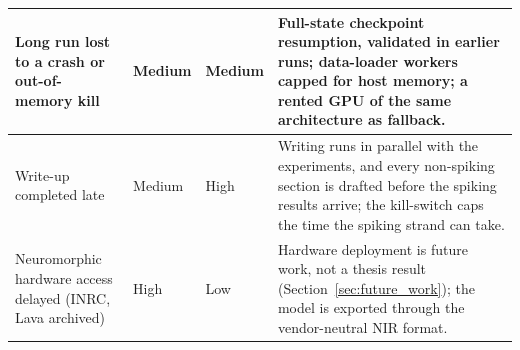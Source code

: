 \documentclass[11pt, a4paper]{report}
\begin{document}
\begin{table}[htbp]
\begin{tabularx}{\textwidth}{|>{\RaggedRight\arraybackslash}p{3.2cm}|l|l|>{\RaggedRight\arraybackslash}X|}
        Long run lost to a crash or out-of-memory kill & Medium & Medium & Full-state checkpoint resumption, validated in earlier runs; data-loader workers capped for host memory; a rented GPU of the same architecture as fallback. \\ \hline
        Write-up completed late & Medium & High & Writing runs in parallel with the experiments, and every non-spiking section is drafted before the spiking results arrive; the kill-switch caps the time the spiking strand can take. \\ \hline
        Neuromorphic hardware access delayed (INRC, Lava archived) & High & Low & Hardware deployment is future work, not a thesis result (Section~\ref{sec:future_work}); the model is exported through the vendor-neutral NIR format. \\ \hline
    \end{tabularx}
\end{table}
\end{document}
